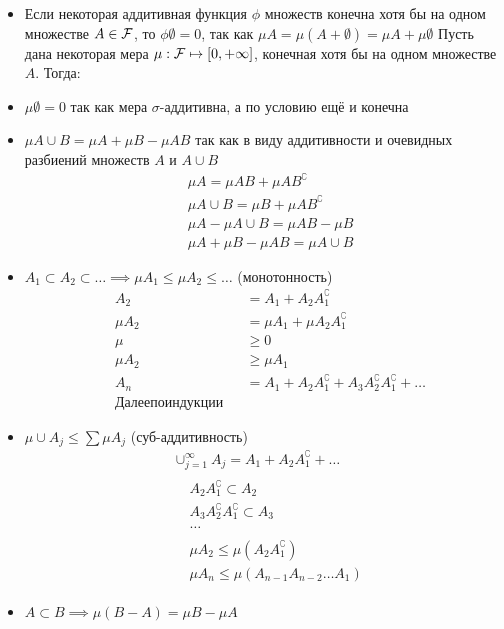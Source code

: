 \begin{itemize}
\item
  Если некоторая аддитивная функция \(\phi\) множеств конечна хотя бы на
  одном множестве \(A\in \mathcal F\), то \(\phi\emptyset = 0\), так
  как \(\mu A = \mu (A+\emptyset) = \mu A + \mu\emptyset\) Пусть дана
  некоторая мера \(\mu : \mathcal F \mapsto [0,+\infty]\), конечная
  хотя бы на одном множестве \(A\). Тогда:
\item
  \(\mu\emptyset = 0\) так как мера \(\sigma\)-аддитивна, а по условию
  ещё и конечна
\item
  \(\mu A\cup B = \mu A + \mu B - \mu AB\) так как в виду аддитивности и
  очевидных разбиений множеств \(A\) и \(A\cup B\) \[\begin{aligned}
    & \mu A       = \mu AB +  \mu A B^\complement \\
    & \mu A\cup B = \mu B  +  \mu A B^\complement \\
    & \mu A - \mu A\cup B = \mu AB - \mu B \\
    & \mu A + \mu B - \mu AB = \mu A\cup B
  \end{aligned}\]
\item
  \(A_{1}\subset A_{2} \subset\ldots \implies \mu A_{1} \leq \mu A_{2} \leq \ldots\)
  (монотонность) \[\begin{aligned}
    & A_2     &&= A_1 + A_2 A_1^\complement \\
    & \mu A_2 &&= \mu A_1 + \mu A_2 A_1^\complement \\
    & \mu     &&\geq 0 \\
    & \mu A_2 &&\geq \mu A_1 \\
    & A_n     &&= A_1 + A_2 A_1^\complement + A_3 A_2^\complement A_1^\complement + \ldots \\
    & Далее по индукции
  \end{aligned}\]
\item
  \(\mu \cup A_j \leq \sum \mu A_j\) (суб-аддитивность)
  \[\begin{aligned}
    & \cup_{j=1}^\infty A_j = A_1 + A_2 A_1^\complement + \ldots \\
    & \begin{aligned}
      & A_2 A_1^\complement \subset A_2 \\
      & A_3 A_2^\complement A_1^\complement \subset A_3\\
      & \ldots
      \end{aligned} \\
    & \begin{aligned}
        & \mu A_2 \leq \mu (A_2 A_1^\complement) \\
        & \mu A_n \leq \mu (A_{n-1} A_{n-2} \ldots A_1)
      \end{aligned}
    \end{aligned}\]
\item
  \(A \subset B \implies \mu (B - A) = \mu B - \mu A\)


\end{itemize}
